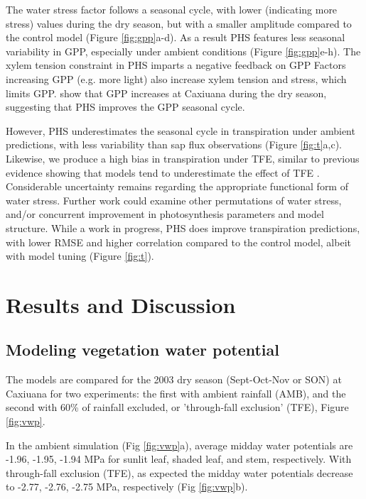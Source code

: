\documentclass[draft,linenumbers]{agujournal}
\begin{document}
    The water stress factor follows a seasonal cycle, with lower (indicating more stress) values during the dry season, 
    but with a smaller amplitude compared to the control model (Figure \ref{fig:gpp}a-d).
    As a result PHS features less seasonal variability in GPP, especially under ambient conditions (Figure \ref{fig:gpp}e-h).
    The xylem tension constraint in PHS imparts a negative feedback on GPP 
    Factors increasing GPP (e.g. more light) also increase xylem tension and stress, which limits GPP.
    \cite{restrepo2017} show that GPP increases at Caxiuana during the dry season, suggesting that PHS improves the GPP seasonal cycle.
    
    However, PHS underestimates the seasonal cycle in transpiration under ambient predictions, with less variability than sap flux observations (Figure \ref{fig:t}a,c).
    Likewise, we produce a high bias in transpiration under TFE, similar to previous evidence showing that models tend to underestimate the effect of TFE \citep{powell2013}.
    Considerable uncertainty remains regarding the appropriate functional form of water stress.
    Further work could examine other permutations of water stress, and/or concurrent improvement in photosynthesis parameters and model structure.
    While a work in progress, PHS does improve transpiration predictions, 
    with lower RMSE and higher correlation compared to the control model, albeit with model tuning (Figure \ref{fig:t}).
    
\section{Results and Discussion}
\subsection{Modeling vegetation water potential}
    
    The models are compared for the 2003 dry season (Sept-Oct-Nov or SON) at Caxiuana for two experiments: the first with ambient rainfall (AMB), and the second with 60\% of rainfall excluded, or 'through-fall exclusion' (TFE), Figure \ref{fig:vwp}. 
    
    In the ambient simulation (Fig \ref{fig:vwp}a), average midday water potentials are -1.96, -1.95, -1.94 MPa for sunlit leaf, shaded leaf, and stem, respectively. With through-fall exclusion (TFE), as expected the midday water potentials decrease to -2.77, -2.76, -2.75 MPa, respectively (Fig \ref{fig:vwp}b).
    
\end{document}
